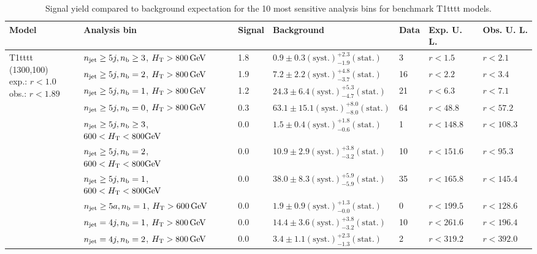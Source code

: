 \begin{table}[h!] 
  \scriptsize
  \caption{ 
Signal yield compared to background expectation for the 10 most sensitive analysis bins 
for benchmark T1tttt models.
  \label{tab:sigBenchmarksYields_T1tttt}}
  \centering 
  \begin{tabular}{ lllllll } 
    \hline 
    \hline 
    Model & Analysis bin & Signal & Background & Data & Exp. U. L. & Obs. U. L. \\ \hline
\multirow{10}{*}{\parbox[t]{2cm}{T1tttt (1300,100)\\exp.: $r<1.0$\\obs.: $r<1.89$}}
 & $n_{\mathrm{jet}} \geq5j,n_{\text{b}} \geq3$, $\mbox{$H_\text{T}$} > 800 \, \mathrm{GeV}$ & 1.8 & $0.9 \pm 0.3 \mathrm{(syst.)} ^{+2.3}_{-1.9} \mathrm{(stat.)}$ & 3 & $r < 1.5$ & $r < 2.1$\\ 
 & $n_{\mathrm{jet}} \geq5j,n_{\text{b}} =2$, $\mbox{$H_\text{T}$} > 800 \, \mathrm{GeV}$ & 1.9 & $7.2 \pm 2.2 \mathrm{(syst.)} ^{+4.8}_{-3.7} \mathrm{(stat.)}$ & 16 & $r < 2.2$ & $r < 3.4$\\ 
 & $n_{\mathrm{jet}} \geq5j,n_{\text{b}} =1$, $\mbox{$H_\text{T}$} > 800 \, \mathrm{GeV}$ & 1.2 & $24.3 \pm 6.4 \mathrm{(syst.)} ^{+5.3}_{-4.7} \mathrm{(stat.)}$ & 21 & $r < 6.3$ & $r < 7.1$\\ 
 & $n_{\mathrm{jet}} \geq5j,n_{\text{b}} =0$, $\mbox{$H_\text{T}$} > 800 \, \mathrm{GeV}$ & 0.3 & $63.1 \pm 15.1 \mathrm{(syst.)} ^{+8.0}_{-8.0} \mathrm{(stat.)}$ & 64 & $r < 48.8$ & $r < 57.2$\\ 
 & $n_{\mathrm{jet}} \geq5j,n_{\text{b}} \geq3$, $600 < \mbox{$H_\text{T}$} < 800 \mathrm{GeV}$ & 0.0 & $1.5 \pm 0.4 \mathrm{(syst.)} ^{+1.8}_{-0.6} \mathrm{(stat.)}$ & 1 & $r < 148.8$ & $r < 108.3$\\ 
 & $n_{\mathrm{jet}} \geq5j,n_{\text{b}} =2$, $600 < \mbox{$H_\text{T}$} < 800 \mathrm{GeV}$ & 0.0 & $10.9 \pm 2.9 \mathrm{(syst.)} ^{+3.8}_{-3.2} \mathrm{(stat.)}$ & 10 & $r < 151.6$ & $r < 95.3$\\ 
 & $n_{\mathrm{jet}} \geq5j,n_{\text{b}} =1$, $600 < \mbox{$H_\text{T}$} < 800 \mathrm{GeV}$ & 0.0 & $38.0 \pm 8.3 \mathrm{(syst.)} ^{+5.9}_{-5.9} \mathrm{(stat.)}$ & 35 & $r < 165.8$ & $r < 145.4$\\ 
 & $n_{\mathrm{jet}} \geq5a,n_{\text{b}} =1$, $\mbox{$H_\text{T}$} > 600 \, \mathrm{GeV}$ & 0.0 & $1.9 \pm 0.9 \mathrm{(syst.)} ^{+1.3}_{-0.0} \mathrm{(stat.)}$ & 0 & $r < 199.5$ & $r < 128.6$\\ 
 & $n_{\mathrm{jet}} =4j,n_{\text{b}} =1$, $\mbox{$H_\text{T}$} > 800 \, \mathrm{GeV}$ & 0.0 & $14.4 \pm 3.6 \mathrm{(syst.)} ^{+3.8}_{-3.2} \mathrm{(stat.)}$ & 10 & $r < 261.6$ & $r < 196.4$\\ 
 & $n_{\mathrm{jet}} =4j,n_{\text{b}} =2$, $\mbox{$H_\text{T}$} > 800 \, \mathrm{GeV}$ & 0.0 & $3.4 \pm 1.1 \mathrm{(syst.)} ^{+2.3}_{-1.3} \mathrm{(stat.)}$ & 2 & $r < 319.2$ & $r < 392.0$\\ \hline

\end{tabular}
\end{table}

